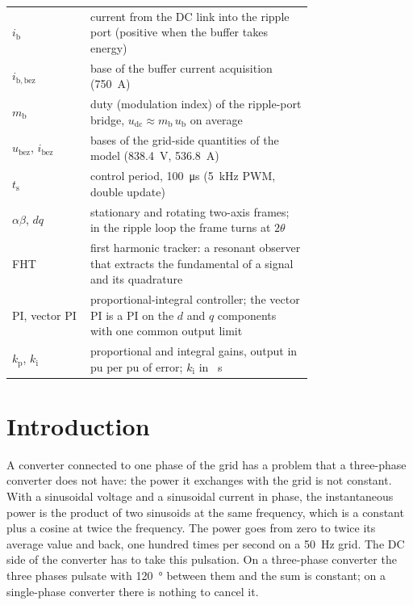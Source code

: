 \documentclass[11pt,a4paper]{scrartcl}
\newcommand{\ped}[1]{_{\mathrm{#1}}}
\begin{document}
\begin{onehalfspace}
\begin{longtable}{@{} l p{0.74\linewidth} @{}}
	$i\ped{b}$ & current from the DC link into the ripple port (positive when the buffer takes energy) \\
	$i\ped{b,bez}$ & base of the buffer current acquisition (\SI{750}{\ampere}) \\
	$m\ped{b}$ & duty (modulation index) of the ripple-port bridge, $u\ped{dc} \approx m\ped{b}\, u\ped{b}$ on average \\
	$u\ped{bez}$, $i\ped{bez}$ & bases of the grid-side quantities of the model (\SI{838.4}{\volt}, \SI{536.8}{\ampere}) \\
	$t\ped{s}$ & control period, \SI{100}{\micro\second} (\SI{5}{\kilo\hertz} PWM, double update) \\
	$\alpha\beta$, $dq$ & stationary and rotating two-axis frames; in the ripple loop the frame turns at $2\theta$ \\
	FHT & first harmonic tracker: a resonant observer that extracts the fundamental of a signal and its quadrature \\
	PI, vector PI & proportional-integral controller; the vector PI is a PI on the $d$ and $q$ components with one common output limit \\
	$k\ped{p}$, $k\ped{i}$ & proportional and integral gains, output in pu per pu of error; $k\ped{i}$ in \si{\per\second} \\
\end{longtable}
\addtocounter{table}{-1}
\endgroup
\section{Introduction}
\label{sec:intro}

A converter connected to one phase of the grid has a problem that a three-phase converter does not have: the power it exchanges with the grid is not constant. With a sinusoidal voltage and a sinusoidal current in phase, the instantaneous power is the product of two sinusoids at the same frequency, which is a constant plus a cosine at twice the frequency. The power goes from zero to twice its average value and back, one hundred times per second on a \SI{50}{\hertz} grid. The DC side of the converter has to take this pulsation. On a three-phase converter the three phases pulsate with \SI{120}{\degree} between them and the sum is constant; on a single-phase converter there is nothing to cancel it.


\end{onehalfspace}
\end{document}
